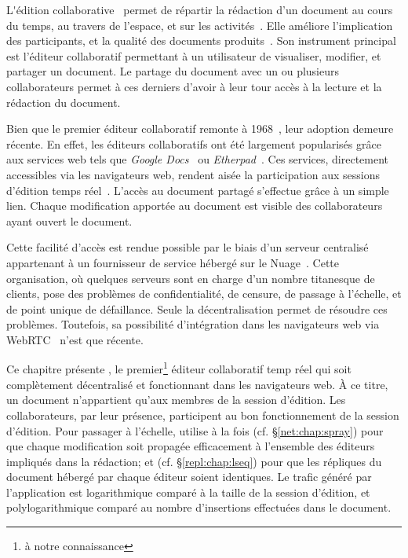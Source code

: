 
\lettrine{L}'édition collaborative~\cite{ellis1989concurrency,
  johansen1988groupware} permet de répartir la rédaction d'un document au cours
du temps, au travers de l'espace, et sur les
activités~\cite{desanctis1987foundation, grudin1994computersupported,
  johansen1988groupware}. Elle améliore l'implication des participants, et la
qualité des documents produits~\cite{giles2005internet, noel2004empirical}. Son
instrument principal est l'éditeur collaboratif permettant à un utilisateur de
visualiser, modifier, et partager un document. Le partage du document avec un ou
plusieurs collaborateurs permet à ces derniers d'avoir à leur tour accès à la
lecture et la rédaction du document.

Bien que le premier éditeur collaboratif remonte à
1968~\cite{engelbart1968research}, leur adoption demeure récente. En effet, les
éditeurs collaboratifs ont été largement popularisés grâce aux services web tels
que \emph{Google Docs}~\cite{googledocs} ou \emph{Etherpad}~\cite{etherpad}. Ces
services, directement accessibles via les navigateurs web, rendent aisée la
participation aux sessions d'édition temps réel~\cite{mogan2010impact}. L'accès
au document partagé s'effectue grâce à un simple lien. Chaque modification
apportée au document est visible des collaborateurs ayant ouvert le document.

Cette facilité d'accès est rendue possible par le biais d'un serveur centralisé
appartenant à un fournisseur de service hébergé sur le
Nuage~\cite{mell2011national}. Cette organisation, où quelques serveurs sont en
charge d'un nombre titanesque de clients, pose des problèmes de confidentialité,
de censure, de passage à l'échelle, et de point unique de défaillance. Seule la
décentralisation permet de résoudre ces problèmes. Toutefois, sa possibilité
d'intégration dans les navigateurs web via WebRTC~\cite{webrtc} n'est que
récente.


Ce chapitre présente \CRATE, le premier\footnote{à notre connaissance} éditeur
collaboratif temp réel qui soit complètement décentralisé et fonctionnant dans
les navigateurs web. À ce titre, un document n'appartient qu'aux membres de la
session d'édition. Les collaborateurs, par leur présence, participent au bon
fonctionnement de la session d'édition. Pour passager à l'échelle, \CRATE
utilise à la fois \SPRAY (cf. §\ref{net:chap:spray}) pour que chaque
modification soit propagée efficacement à l'ensemble des éditeurs impliqués dans
la rédaction; et \LSEQ (cf. §\ref{repl:chap:lseq}) pour que les répliques du
document hébergé par chaque éditeur soient identiques. Le trafic généré par
l'application est logarithmique comparé à la taille de la session d'édition, et
polylogarithmique comparé au nombre d'insertions effectuées dans le document.

